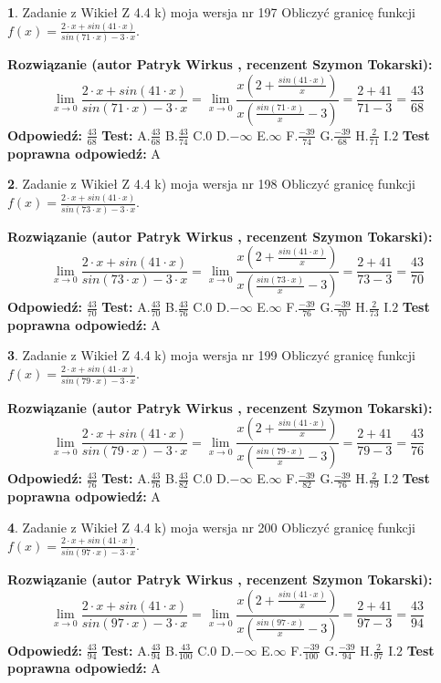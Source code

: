 \documentclass[12pt, a4paper]{article}
\theoremstyle{definition} %
\newtheorem{zad}{}
\newcommand{\zadStart}[1]{\begin{zad}#1\newline}
\newcommand{\zadStop}{\end{zad}}
\newcommand{\rozwStart}[2]{\noindent \textbf{Rozwiązanie (autor #1 , recenzent #2): }\newline}
\newcommand{\rozwStop}{\newline}
\newcommand{\odpStart}{\noindent \textbf{Odpowiedź:}\newline}
\newcommand{\odpStop}{\newline}
\newcommand{\testStart}{\noindent \textbf{Test:}\newline}
\newcommand{\testStop}{\newline}
\newcommand{\kluczStart}{\noindent \textbf{Test poprawna odpowiedź:}\newline}
\newcommand{\kluczStop}{\newline}
\begin{document}
\zadStart{Zadanie z Wikieł Z 4.4 k) moja wersja nr 197}
Obliczyć granicę funkcji $f(x)=\frac{2\cdot x +sin(41\cdot x)}{sin(71\cdot x) -3\cdot x}$.
\zadStop
\rozwStart{Patryk Wirkus}{Szymon Tokarski}
$$\lim\limits_{x\to 0}\frac{2\cdot x +sin(41\cdot x)}{sin(71\cdot x) -3\cdot x}
=\lim\limits_{x\to 0}\frac{x(2+\frac{sin(41\cdot x)}{x})}{x(\frac{sin(71\cdot x)}{x}-3)}
=\frac{2+41}{71-3} = \frac{43}{68}$$
\rozwStop
\odpStart
$\frac{43}{68}$
\odpStop
\testStart
A.$\frac{43}{68}$
B.$\frac{43}{74}$
C.$0$
D.$-\infty$
E.$\infty$
F.$\frac{-39}{74}$
G.$\frac{-39}{68}$
H.$\frac{2}{71}$
I.$2$
\testStop
\kluczStart
A
\kluczStop



\zadStart{Zadanie z Wikieł Z 4.4 k) moja wersja nr 198}
Obliczyć granicę funkcji $f(x)=\frac{2\cdot x +sin(41\cdot x)}{sin(73\cdot x) -3\cdot x}$.
\zadStop
\rozwStart{Patryk Wirkus}{Szymon Tokarski}
$$\lim\limits_{x\to 0}\frac{2\cdot x +sin(41\cdot x)}{sin(73\cdot x) -3\cdot x}
=\lim\limits_{x\to 0}\frac{x(2+\frac{sin(41\cdot x)}{x})}{x(\frac{sin(73\cdot x)}{x}-3)}
=\frac{2+41}{73-3} = \frac{43}{70}$$
\rozwStop
\odpStart
$\frac{43}{70}$
\odpStop
\testStart
A.$\frac{43}{70}$
B.$\frac{43}{76}$
C.$0$
D.$-\infty$
E.$\infty$
F.$\frac{-39}{76}$
G.$\frac{-39}{70}$
H.$\frac{2}{73}$
I.$2$
\testStop
\kluczStart
A
\kluczStop



\zadStart{Zadanie z Wikieł Z 4.4 k) moja wersja nr 199}
Obliczyć granicę funkcji $f(x)=\frac{2\cdot x +sin(41\cdot x)}{sin(79\cdot x) -3\cdot x}$.
\zadStop
\rozwStart{Patryk Wirkus}{Szymon Tokarski}
$$\lim\limits_{x\to 0}\frac{2\cdot x +sin(41\cdot x)}{sin(79\cdot x) -3\cdot x}
=\lim\limits_{x\to 0}\frac{x(2+\frac{sin(41\cdot x)}{x})}{x(\frac{sin(79\cdot x)}{x}-3)}
=\frac{2+41}{79-3} = \frac{43}{76}$$
\rozwStop
\odpStart
$\frac{43}{76}$
\odpStop
\testStart
A.$\frac{43}{76}$
B.$\frac{43}{82}$
C.$0$
D.$-\infty$
E.$\infty$
F.$\frac{-39}{82}$
G.$\frac{-39}{76}$
H.$\frac{2}{79}$
I.$2$
\testStop
\kluczStart
A
\kluczStop



\zadStart{Zadanie z Wikieł Z 4.4 k) moja wersja nr 200}
Obliczyć granicę funkcji $f(x)=\frac{2\cdot x +sin(41\cdot x)}{sin(97\cdot x) -3\cdot x}$.
\zadStop
\rozwStart{Patryk Wirkus}{Szymon Tokarski}
$$\lim\limits_{x\to 0}\frac{2\cdot x +sin(41\cdot x)}{sin(97\cdot x) -3\cdot x}
=\lim\limits_{x\to 0}\frac{x(2+\frac{sin(41\cdot x)}{x})}{x(\frac{sin(97\cdot x)}{x}-3)}
=\frac{2+41}{97-3} = \frac{43}{94}$$
\rozwStop
\odpStart
$\frac{43}{94}$
\odpStop
\testStart
A.$\frac{43}{94}$
B.$\frac{43}{100}$
C.$0$
D.$-\infty$
E.$\infty$
F.$\frac{-39}{100}$
G.$\frac{-39}{94}$
H.$\frac{2}{97}$
I.$2$
\testStop
\kluczStart
A
\kluczStop
\end{document}
